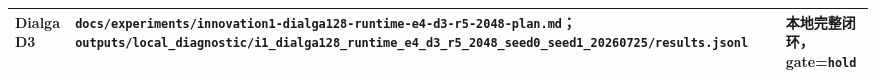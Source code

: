 \documentclass[
  a4paper,
  UTF8]{ctexart}
\begin{document}
\begin{longtable}[]{@{}lll@{}}
\begin{minipage}[t]{0.30\columnwidth}
Dialga D3\strut
\end{minipage} & \begin{minipage}[t]{0.30\columnwidth}\raggedright
\nolinkurl{docs/experiments/innovation1-dialga128-runtime-e4-d3-r5-2048-plan.md}；\nolinkurl{outputs/local_diagnostic/i1_dialga128_runtime_e4_d3_r5_2048_seed0_seed1_20260725/results.jsonl}\strut
\end{minipage} & \begin{minipage}[t]{0.30\columnwidth}\raggedright
本地完整闭环，gate=\texttt{hold}\strut
\end{minipage}\tabularnewline
\bottomrule
\end{longtable}
\end{document}
